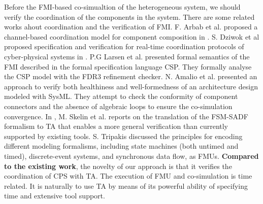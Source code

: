 Before the FMI-based co-simualtion of the heterogeneous system, we should verify the coordination of the components in the system. There are some related works ahout coordination and the verification of FMI. F. Arbab et al. proposed a channel-based coordination model for component composition in \cite{Arbab2002Reo}. S. Dziwok et al proposed specification and verification for real-time coordination protocols of cyber-physical systems in \cite{Dziwok17}. P.G Larsen et al. \cite{Larsen2016Integrated} presented formal semantics of the FMI described in the formal specification language CSP. They formally analyse the CSP model with the FDR3 refinement checker. N. Amalio et al. \cite{AmalioPCW16} presented an approach to verify both healthiness and well-formedness of an architecture design modeled with SysML. They attempt to check the conformity of component connectors and the absence of algebraic loops to ensure the co-simulation convergence.
In \cite{SkelinWOHL15}, M. Skelin et al. reports on the translation of the FSM-SADF formalism to TA that enables a more general verification than currently supported by existing tools. S. Tripakis \cite{Tripakis15} discussed the principles for encoding different modeling formalisms, including state machines (both untimed and timed), discrete-event systems, and synchronous data flow, as FMUs. 
\textbf{Compared to the existing work}, the novelty of our approach is that it verifies the coordination of CPS with TA. The execution of FMU and co-simulation is time related. It is naturally to use TA by means of its powerful ability of specifying time and extensive tool support.


